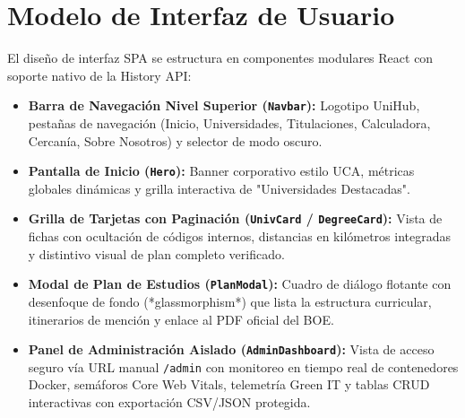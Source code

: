 \section{Modelo de Interfaz de Usuario}
El diseño de interfaz SPA se estructura en componentes modulares React con soporte nativo de la History API:
\begin{itemize}
    \item \textbf{Barra de Navegación Nivel Superior (\texttt{Navbar}):} Logotipo UniHub, pestañas de navegación (Inicio, Universidades, Titulaciones, Calculadora, Cercanía, Sobre Nosotros) y selector de modo oscuro.
    \item \textbf{Pantalla de Inicio (\texttt{Hero}):} Banner corporativo estilo UCA, métricas globales dinámicas y grilla interactiva de "Universidades Destacadas".
    \item \textbf{Grilla de Tarjetas con Paginación (\texttt{UnivCard} / \texttt{DegreeCard}):} Vista de fichas con ocultación de códigos internos, distancias en kilómetros integradas y distintivo visual de plan completo verificado.
    \item \textbf{Modal de Plan de Estudios (\texttt{PlanModal}):} Cuadro de diálogo flotante con desenfoque de fondo (*glassmorphism*) que lista la estructura curricular, itinerarios de mención y enlace al PDF oficial del BOE.
    \item \textbf{Panel de Administración Aislado (\texttt{AdminDashboard}):} Vista de acceso seguro vía URL manual \texttt{/admin} con monitoreo en tiempo real de contenedores Docker, semáforos Core Web Vitals, telemetría Green IT y tablas CRUD interactivas con exportación CSV/JSON protegida.
\end{itemize}
